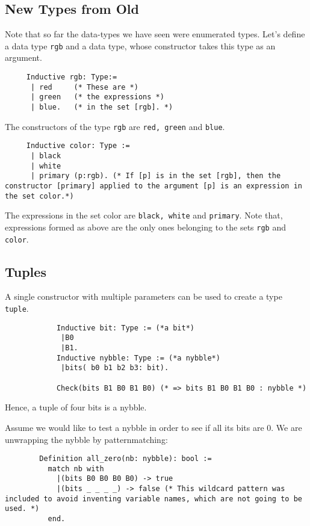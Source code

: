 \subsection{New Types from Old}
     
     
	 Note that so far the data-types we have seen were enumerated types.
	 Let's define a data type \lstinline!rgb! and a data type, whose constructor takes this type as an argument.
	\begin{lstlisting}
	 Inductive rgb: Type:=
	  | red     (* These are *)
	  | green   (* the expressions *)
	  | blue.   (* in the set [rgb]. *)
	 \end{lstlisting}
	 The constructors of the type \lstinline!rgb! are \lstinline!red, green! and \lstinline!blue!. 
	 
	 \begin{lstlisting}
	 Inductive color: Type := 
	  | black
	  | white
	  | primary (p:rgb). (* If [p] is in the set [rgb], then the constructor [primary] applied to the argument [p] is an expression in the set color.*) 
	 \end{lstlisting}
	 
	 The expressions in the set color are \lstinline!black, white! and \lstinline!primary!.
	 Note that, expressions formed as above are the only ones belonging to the sets \lstinline!rgb! and \lstinline!color!.
	 

\subsection{Tuples}

    A single constructor with multiple parameters can be used to create a type \lstinline! tuple!.
	\begin{example}
 	 	\begin{lstlisting}
 	 		Inductive bit: Type := (*a bit*) 
 	 		 |B0
 	 		 |B1.
 		    Inductive nybble: Type := (*a nybble*)
 		   	 |bits( b0 b1 b2 b3: bit).
 		   			 	
 		   	Check(bits B1 B0 B1 B0) (* => bits B1 B0 B1 B0 : nybble *)
 		\end{lstlisting}
 		Hence, a tuple of four bits is a nybble.
 		
 		Assume we would like to test a nybble in order to see if all its bits are 0. We are unwrapping the nybble by patternmatching:
 		\begin{lstlisting}
 		Definition all_zero(nb: nybble): bool :=
 		  match nb with
 	  	    |(bits B0 B0 B0 B0) -> true
 		    |(bits _ _ _ _) -> false (* This wildcard pattern was included to avoid inventing variable names, which are not going to be used. *) 
 		  end.
 		 \end{lstlisting}
 	\end{example}
 	

